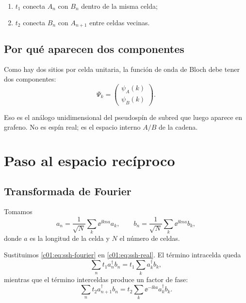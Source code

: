 \begin{enumerate}[leftmargin=*]
  \item \(t_1\) conecta \(A_n\) con \(B_n\) dentro de la misma celda;
  \item \(t_2\) conecta \(B_n\) con \(A_{n+1}\) entre celdas vecinas.
\end{enumerate}

\subsection{Por qué aparecen dos componentes}

Como hay dos sitios por celda unitaria, la función de onda de Bloch debe tener dos componentes:
\begin{equation}
\Psi_k =
\begin{pmatrix}
\psi_A(k)\\
\psi_B(k)
\end{pmatrix}.
\end{equation}

Eso es el análogo unidimensional del pseudospín de subred que luego aparece en grafeno. No es espín real; es el espacio interno \(A/B\) de la cadena.

\section{Paso al espacio recíproco}

\subsection{Transformada de Fourier}

Tomamos
\begin{equation}
a_n=\frac{1}{\sqrt{N}}\sum_k \ee^{\ii k n a} a_k,
\qquad
b_n=\frac{1}{\sqrt{N}}\sum_k \ee^{\ii k n a} b_k,
\label{c01:eq:ssh-fourier}
\end{equation}
donde \(a\) es la longitud de la celda y \(N\) el número de celdas.

Sustituimos \eqref{c01:eq:ssh-fourier} en \eqref{c01:eq:ssh-real}. El término intracelda queda
\begin{equation}
\sum_n t_1 a_n^\dagger b_n
=
t_1 \sum_k a_k^\dagger b_k,
\end{equation}
mientras que el término interceldas produce un factor de fase:
\begin{equation}
\sum_n t_2 a_{n+1}^\dagger b_n
=
t_2 \sum_k \ee^{-\ii k a} a_k^\dagger b_k.
\end{equation}

